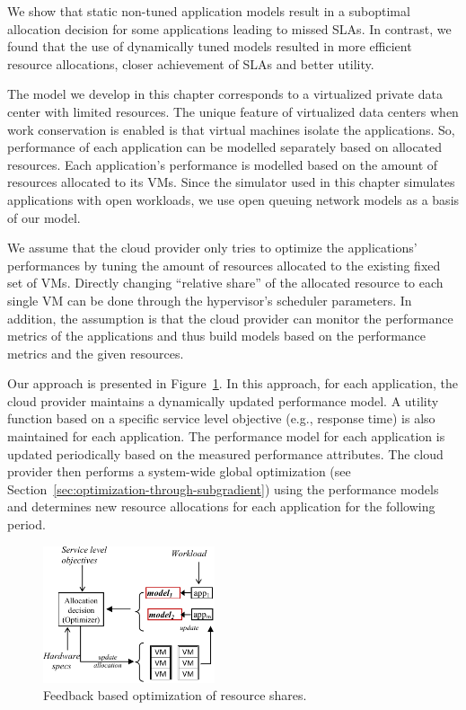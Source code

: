 We show that static non-tuned application models result in a suboptimal allocation decision for some applications leading to missed SLAs. In contrast, we found that the use of dynamically tuned models resulted in more efficient resource allocations, closer achievement of SLAs and better utility. 

The model we develop in this chapter corresponds to a virtualized private data center with limited resources. The unique feature of virtualized data centers when work conservation is enabled is that virtual machines isolate the applications. So, performance of each application can be modelled separately based on allocated resources.
Each application's performance is modelled based on the amount of resources allocated to its VMs. Since the simulator used in this chapter simulates applications with open workloads, we use open queuing network models as a basis of our model.

We assume that the cloud provider only tries to optimize the applications' performances by tuning the amount of resources allocated to the existing fixed set of VMs.  Directly changing ``relative share'' of the allocated resource to each single VM can be done through the hypervisor's scheduler parameters. In addition, the assumption is that the cloud provider can monitor the performance metrics of the applications and thus build models based on the performance metrics and the given resources.
 
Our approach is presented in Figure~\ref{fig:feedback-based-optimization}. 
In this approach, for each application, the  cloud provider maintains a dynamically updated performance model. 
A utility function based on a specific service level objective (e.g., response time) is also maintained for each application.    
The  performance model for each application is updated periodically based on the measured performance attributes.  The cloud provider then performs a system-wide global optimization (see Section~\ref{sec:optimization-through-subgradient}) using the performance models and determines new resource allocations for each application for the following period. 
\begin{figure}[h]
	\centering
		\includegraphics[width=0.45\textwidth]{image/centralized1/image2new}
	\caption[Architecture of the proposed feedback-based optimization approach for private cloud.]{Feedback based optimization of resource shares.} 
	\label{fig:feedback-based-optimization}
\end{figure}


